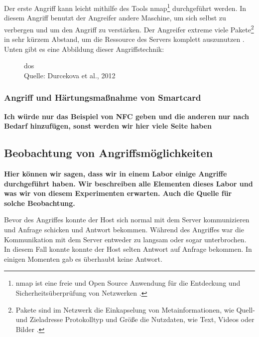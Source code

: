 Der erste Angriff kann leicht mithilfe des Tools \acrfull{nmap}\footnote{\acrshort{nmap} ist eine freie und Open Source Anwendung
für die Entdeckung und Sicherheitsüberprüfung von Netzwerken \cite{refst:nmap}.} durchgeführt werden. In diesem Angriff benutzt
der Angreifer andere Maschine, um sich selbst zu verbergen und um den Angriff zu verstärken. Der Angreifer extreme viele
Pakete\footnote{Pakete sind im Netzwerk die Einkapselung von Metainformationen, wie Quell- und Zieladresse Protokolltyp 
und Größe die Nutzdaten, wie Text, Videos oder Bilder \cite{refbook:SWIS}.} in sehr kürzem Abstand, um die Ressource des 
Servers komplett auszunutzen \cite{refip:KSDD}. Unten gibt es eine Abbildung dieser Angriffstechnik:

\begin{figure}[H]
  \caption{\acrfull{dos}\\ Quelle: Durcekova et al., 2012}
  \label{fig:VDSD}
\end{figure}

\subsubsection{Angriff und Härtungsmaßnahme von Smartcard}
\textbf{Ich würde nur das Beispiel von NFC geben und die anderen nur nach Bedarf hinzufügen, sonst werden wir hier
viele Seite haben}


\subsection{Beobachtung von Angriffsmöglichkeiten}
\textbf{Hier können wir sagen, dass wir in einem Labor einige Angriffe durchgeführt haben. Wir beschreiben alle Elementen
dieses Labor und was wir von diesem Experimenten erwarten. Auch die Quelle für solche Beobachtung.}

Bevor des Angriffes konnte der Host sich normal mit dem Server kommunizieren und Anfrage schicken und Antwort bekommen.
Während des Angriffes war die Kommunikation mit dem Server entweder zu langsam oder sogar unterbrochen. In diesem Fall
konnte konnte der Host selten Antwort auf Anfrage bekommen. In einigen Momenten gab es überhaubt keine Antwort. 

